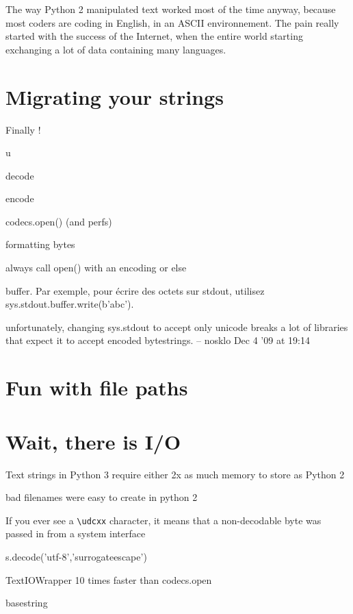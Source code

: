 The way Python 2 manipulated text worked most of the time anyway, because most coders are coding in English, in an ASCII environnement. The pain really started with the success of the Internet, when the entire world starting exchanging a lot of data containing many languages.

\section{Migrating your strings}

Finally !



u

decode

encode

codecs.open() (and perfs)

formatting bytes

always call open() with an encoding or else

buffer. Par exemple, pour écrire des octets sur stdout, utilisez sys.stdout.buffer.write(b'abc').

unfortunately, changing sys.stdout to accept only unicode breaks a lot of libraries that expect it to accept encoded bytestrings. – nosklo Dec 4 '09 at 19:14


\section{Fun with file paths}

\section{Wait, there is I/O}


Text strings in Python 3 require either 2x as much memory to store as Python 2


bad filenames were easy to create in python 2

If you ever see a \lstinline{\udcxx} character, it means that a non-decodable byte was passed in from a system interface

s.decode('utf-8','surrogateescape')

TextIOWrapper 10 times faster than codecs.open

basestring


